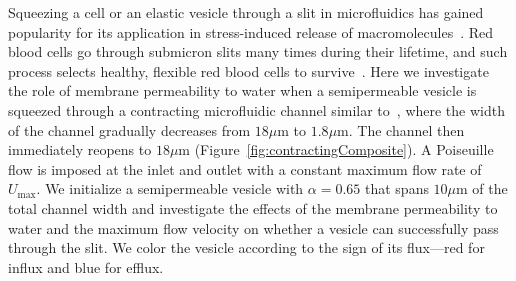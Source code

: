 \documentclass[9pt,twocolumn,twoside,lineno]{pnas-new}
\begin{document}
Squeezing a cell or an elastic vesicle through a slit in microfluidics
has gained popularity for its application in stress-induced release of
macromolecules~\cite{ShareiEtAl2013_PNAS, Pak2015_PNAS,
ZhangShenHoganBarakatMisbah2018_BJ, LuoBai2019_PoF}. Red blood cells go
through submicron slits many times during their lifetime, and such
process selects healthy, flexible red blood cells to
survive~\cite{wu2015critical,LuPeng2019_PoF}. Here we investigate the
role of membrane permeability to water when a semipermeable vesicle is
squeezed through a contracting microfluidic channel similar
to~\cite{wu2015critical}, where the width of the channel gradually
decreases from $18 \mu$m to $1.8 \mu$m. The channel then immediately
reopens to $18 \mu$m (Figure~\ref{fig:contractingComposite}). A
Poiseuille flow is imposed at the inlet and outlet with a constant
maximum flow rate of $U_{\max}$. We initialize a semipermeable vesicle
with $\alpha = 0.65$ that spans $10 \mu$m of the total channel width and
investigate the effects of the membrane permeability to water and the
maximum flow velocity on whether a vesicle can successfully pass through
the slit. We color the vesicle according to the sign of its flux---red
for influx and blue for efflux.
\end{document}

